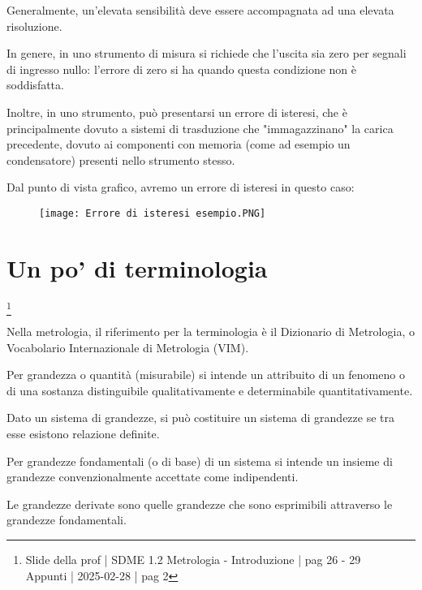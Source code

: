 Generalmente, un'elevata sensibilità deve essere accompagnata ad una elevata risoluzione. \newline 

In genere, in uno strumento di misura si richiede che l'uscita sia zero per segnali di ingresso nullo: 
l'errore di zero si ha quando questa condizione non è soddisfatta. \newline 

Inoltre, in uno strumento, può presentarsi un errore di isteresi, che è principalmente dovuto a sistemi di trasduzione che "immagazzinano" la carica precedente, dovuto ai componenti con memoria (come ad esempio un condensatore) presenti nello strumento stesso. \newline 

Dal punto di vista grafico, avremo un errore di isteresi in questo caso: 

\begin{figure}[h]
    \centering
    \texttt{[image: Errore di isteresi esempio.PNG]}
\end{figure} 

\newpage 

\section{Un po' di terminologia} 
\footnote{Slide della prof | SDME 1.2 Metrologia - Introduzione | pag 26 - 29 \\  
Appunti | 2025-02-28 | pag 2}

Nella metrologia, il riferimento per la terminologia è il Dizionario di Metrologia, o Vocabolario Internazionale di Metrologia (VIM). \newline 

Per grandezza o quantità (misurabile) si intende un attribuito di un fenomeno o di una sostanza distinguibile qualitativamente e determinabile quantitativamente. \newline 

Dato un sistema di grandezze, si può costituire un sistema di grandezze se tra esse esistono relazione definite. \newline 

Per grandezze fondamentali (o di base) di un sistema si intende un insieme di grandezze convenzionalmente accettate come indipendenti. \newline 

Le grandezze derivate sono quelle grandezze che sono esprimibili attraverso le grandezze fondamentali. \newline 

